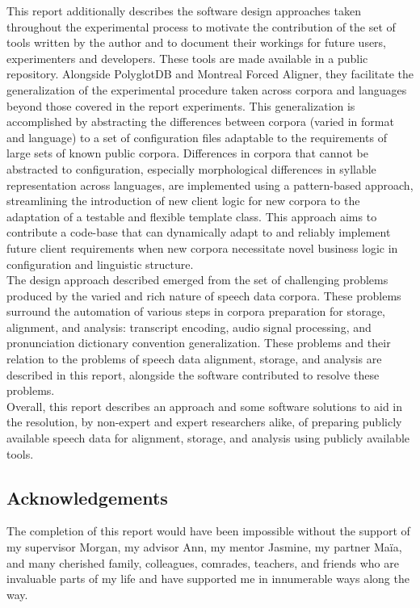 \documentclass[11pt]{article}
\begin{document}
This report additionally describes the software design approaches taken throughout the experimental process to motivate the contribution of the set of tools written by the author and to document their workings for future users, experimenters and developers. These tools are made available in a public repository. Alongside PolyglotDB and Montreal Forced Aligner, they facilitate the generalization of the experimental procedure taken across corpora and languages beyond those covered in the report experiments. This generalization is accomplished by abstracting the differences between corpora (varied in format and language) to a set of configuration files adaptable to the requirements of large sets of known public corpora. Differences in corpora that cannot be abstracted to configuration, especially morphological differences in syllable representation across languages, are implemented using a pattern-based approach, streamlining the introduction of new client logic for new corpora to the adaptation of a testable and flexible template class. This approach aims to contribute a code-base that can dynamically adapt to and reliably implement future client requirements when new corpora necessitate novel business logic in configuration and linguistic structure. \\

The design approach described emerged from the set of challenging problems produced by the varied and rich nature of speech data corpora. These problems surround the automation of various steps in corpora preparation for storage, alignment, and analysis: transcript encoding, audio signal processing, and pronunciation dictionary convention generalization. These problems and their relation to the problems of speech data alignment, storage, and analysis are described in this report, alongside the software contributed to resolve these problems. \\

Overall, this report describes an approach and some software solutions to aid in the resolution, by non-expert and expert researchers alike, of preparing publicly available speech data for alignment, storage, and analysis using publicly available tools. \\

\subsection{Acknowledgements}

The completion of this report would have been impossible without the support of my supervisor Morgan, my advisor Ann, my mentor Jasmine, my partner Ma\"ia, and many cherished family, colleagues, comrades, teachers, and friends who are invaluable parts of my life and have supported me in innumerable ways along the way.
\end{document}
